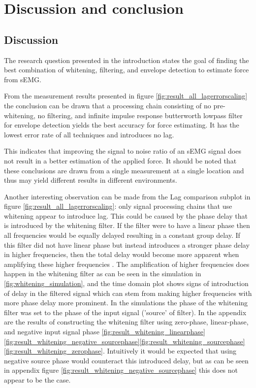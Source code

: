 \chapter{Discussion and conclusion}
\section{Discussion}
The research question presented in the introduction states the goal of finding the best combination of whitening, filtering, and envelope detection to estimate force from sEMG. 

From the measurement results presented in figure \ref{fig:result_all_lagerrorscaling} the conclusion can be drawn that a processing chain consisting of no pre-whitening, no filtering, and infinite impulse response butterworth lowpass filter for envelope detection yields the best accuracy for force estimating. It has the lowest error rate of all techniques and introduces no lag.

This indicates that improving the signal to noise ratio of an sEMG signal does not result in a better estimation of the applied force. It should be noted that these conclusions are drawn from a single measurement at a single location and thus may yield different results in different environments. 

Another interesting observation can be made from the Lag comparison subplot in figure \ref{fig:result_all_lagerrorscaling}: only signal processing chains that use whitening appear to introduce lag. This could be caused by the phase delay that is introduced by the whitening filter. If the filter were to have a linear phase then all frequencies would be equally delayed resulting in a constant group delay. If this filter did not have linear phase but instead introduces a stronger phase delay in higher frequencies, then the total delay would become more apparent when amplifying these higher frequencies \cite{phase_delay_frequencies}. The amplification of higher frequencies does happen in the whitening filter as can be seen in the simulation in \ref{fig:whitening_simulation}, and the time domain plot shows signs of introduction of delay in the filtered signal which can stem from making higher frequencies with more phase delay more prominent. In the simulations the phase of the whitening filter was set to the phase of the input signal ('source' of filter). In the appendix are the results of constructing the whitening filter using zero-phase, linear-phase, and negative input signal phase \ref{fig:result_whitening_linearphase} \ref{fig:result_whitening_negative_sourcephase}\ref{fig:result_whitening_sourcephase}\ref{fig:result_whitening_zerophase}. Intuitively it would be expected that using negative source phase would counteract this introduced delay, but as can be seen in appendix figure \ref{fig:result_whitening_negative_sourcephase} this does not appear to be the case.

